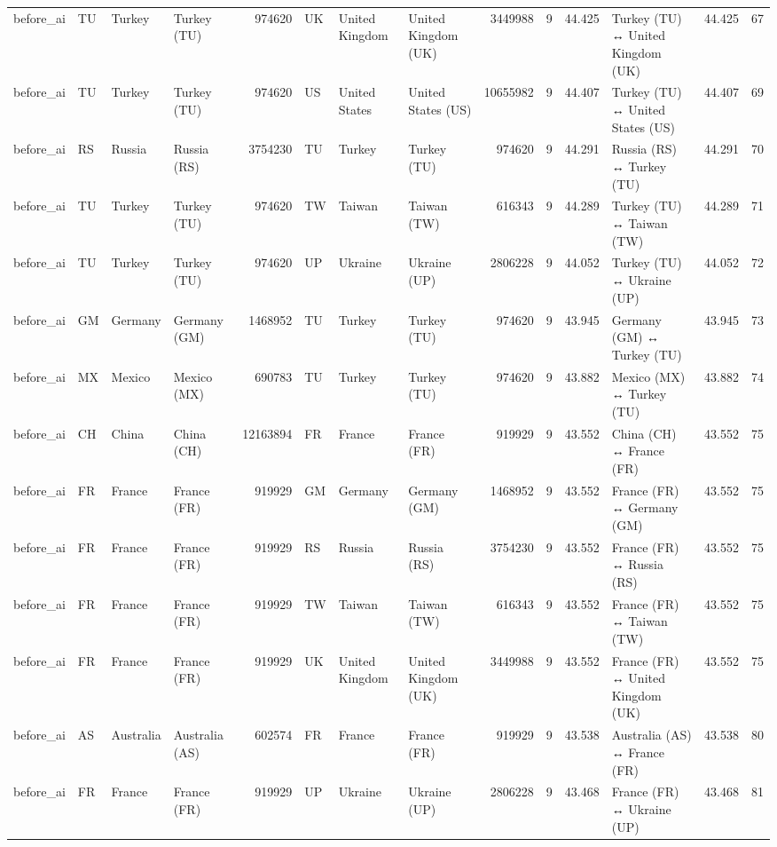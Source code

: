 \begin{tabular}{llllrlllrrrlrr}
before\_ai & TU & Turkey & Turkey (TU) & 974620 & UK & United Kingdom & United Kingdom (UK) & 3449988 & 9 & 44.425 & Turkey (TU) ↔ United Kingdom (UK) & 44.425 & 67 \\
before\_ai & TU & Turkey & Turkey (TU) & 974620 & US & United States & United States (US) & 10655982 & 9 & 44.407 & Turkey (TU) ↔ United States (US) & 44.407 & 69 \\
before\_ai & RS & Russia & Russia (RS) & 3754230 & TU & Turkey & Turkey (TU) & 974620 & 9 & 44.291 & Russia (RS) ↔ Turkey (TU) & 44.291 & 70 \\
before\_ai & TU & Turkey & Turkey (TU) & 974620 & TW & Taiwan & Taiwan (TW) & 616343 & 9 & 44.289 & Turkey (TU) ↔ Taiwan (TW) & 44.289 & 71 \\
before\_ai & TU & Turkey & Turkey (TU) & 974620 & UP & Ukraine & Ukraine (UP) & 2806228 & 9 & 44.052 & Turkey (TU) ↔ Ukraine (UP) & 44.052 & 72 \\
before\_ai & GM & Germany & Germany (GM) & 1468952 & TU & Turkey & Turkey (TU) & 974620 & 9 & 43.945 & Germany (GM) ↔ Turkey (TU) & 43.945 & 73 \\
before\_ai & MX & Mexico & Mexico (MX) & 690783 & TU & Turkey & Turkey (TU) & 974620 & 9 & 43.882 & Mexico (MX) ↔ Turkey (TU) & 43.882 & 74 \\
before\_ai & CH & China & China (CH) & 12163894 & FR & France & France (FR) & 919929 & 9 & 43.552 & China (CH) ↔ France (FR) & 43.552 & 75 \\
before\_ai & FR & France & France (FR) & 919929 & GM & Germany & Germany (GM) & 1468952 & 9 & 43.552 & France (FR) ↔ Germany (GM) & 43.552 & 75 \\
before\_ai & FR & France & France (FR) & 919929 & RS & Russia & Russia (RS) & 3754230 & 9 & 43.552 & France (FR) ↔ Russia (RS) & 43.552 & 75 \\
before\_ai & FR & France & France (FR) & 919929 & TW & Taiwan & Taiwan (TW) & 616343 & 9 & 43.552 & France (FR) ↔ Taiwan (TW) & 43.552 & 75 \\
before\_ai & FR & France & France (FR) & 919929 & UK & United Kingdom & United Kingdom (UK) & 3449988 & 9 & 43.552 & France (FR) ↔ United Kingdom (UK) & 43.552 & 75 \\
before\_ai & AS & Australia & Australia (AS) & 602574 & FR & France & France (FR) & 919929 & 9 & 43.538 & Australia (AS) ↔ France (FR) & 43.538 & 80 \\
before\_ai & FR & France & France (FR) & 919929 & UP & Ukraine & Ukraine (UP) & 2806228 & 9 & 43.468 & France (FR) ↔ Ukraine (UP) & 43.468 & 81 \\

\end{tabular}
